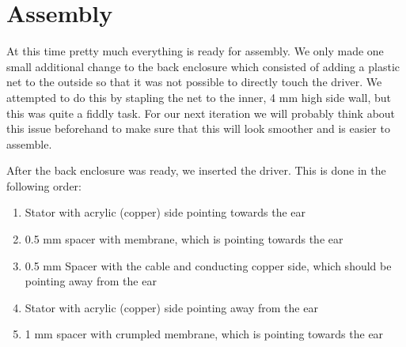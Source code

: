 \documentclass{article}
\begin{document}

\section{Assembly}
\label{s:assembly}

At this time pretty much everything is ready for assembly. We only made one small additional change to the back enclosure which consisted of adding a plastic net to the outside so that it was not possible to directly touch the driver. We attempted to do this by stapling the net to the inner, 4 mm high side wall, but this was quite a fiddly task. For our next iteration we will probably think about this issue beforehand to make sure that this will look smoother and is easier to assemble.

After the back enclosure was ready, we inserted the driver. This is done in the following order:

\begin{enumerate}
\item Stator with acrylic (copper) side pointing towards the ear
\item 0.5 mm spacer with membrane, which is pointing towards the ear
\item 0.5 mm Spacer with the cable and conducting copper side, which should be pointing away from the ear
\item Stator with acrylic (copper) side pointing away from the ear
\item 1 mm spacer with crumpled membrane, which is pointing towards the ear
\end{enumerate}
\end{document}
